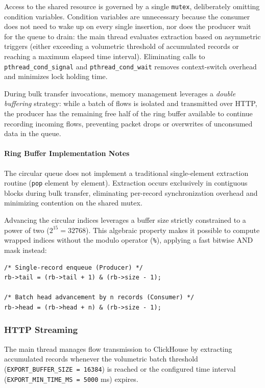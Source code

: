 \documentclass[11pt,a4paper]{article}
\newenvironment{codebox}[1][]{%
    \begin{tcolorbox}[
        colback=codebg,
        colframe=codeframe,
        boxrule=0.6pt,
        arc=1.5mm,
        left=3mm,
        right=3mm,
        top=2mm,
        bottom=2mm,
        fonttitle=\sffamily\bfseries\footnotesize,
        coltitle=chibadark,
        colbacktitle=codeframe!50!white,
        #1
    ]
}{%
    \end{tcolorbox}
}
\begin{document}
Access to the shared resource is governed by a single \texttt{mutex}, deliberately omitting condition variables. Condition variables are unnecessary because the consumer does not need to wake up on every single insertion, nor does the producer wait for the queue to drain: the main thread evaluates extraction based on asymmetric triggers (either exceeding a volumetric threshold of accumulated records or reaching a maximum elapsed time interval). Eliminating calls to \texttt{pthread\_cond\_signal} and \texttt{pthread\_cond\_wait} removes context-switch overhead and minimizes lock holding time.

During bulk transfer invocations, memory management leverages a \emph{double buffering} strategy: while a batch of flows is isolated and transmitted over HTTP, the producer has the remaining free half of the ring buffer available to continue recording incoming flows, preventing packet drops or overwrites of unconsumed data in the queue.

\paragraph{Ring Buffer Implementation Notes}
The circular queue does not implement a traditional single-element extraction routine (\texttt{pop} element by element). Extraction occurs exclusively in contiguous blocks during bulk transfer, eliminating per-record synchronization overhead and minimizing contention on the shared mutex.

Advancing the circular indices leverages a buffer size strictly constrained to a power of two ($2^{15} = 32768$). This algebraic property makes it possible to compute wrapped indices without the modulo operator (\texttt{\%}), applying a fast bitwise AND mask instead:
\begin{codebox}[title={Bitwise Ring Buffer Index Advancement (C)}]
\footnotesize
\begin{verbatim}
/* Single-record enqueue (Producer) */
rb->tail = (rb->tail + 1) & (rb->size - 1);

/* Batch head advancement by n records (Consumer) */
rb->head = (rb->head + n) & (rb->size - 1);
\end{verbatim}
\end{codebox}

\subsubsection{HTTP Streaming}
The main thread manages flow transmission to ClickHouse by extracting accumulated records whenever the volumetric batch threshold (\texttt{EXPORT\_BUFFER\_SIZE = 16384}) is reached or the configured time interval (\texttt{EXPORT\_MIN\_TIME\_MS = 5000} ms) expires.
\end{document}
